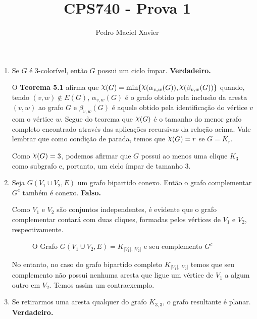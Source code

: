 \documentclass{homework}
\title{CPS740 - Prova 1}
\author{Pedro Maciel Xavier}
\begin{document}
	
	\maketitle
	
	\quest
	
	\begin{enumerate}[label=\textbf{\arabic*)}]
		\item Se $G$ é 3-colorível, então $G$ possui um ciclo ímpar. \textbf{Verdadeiro.} \par
		
		O \textbf{Teorema 5.1}\cite{jayme:18} afirma que $\rchi(G) = \min\{\rchi(\alpha_{v, w}(G)), \rchi(\beta_{v, w}(G))\}$ quando, tendo $(v, w) \notin E(G)$, $\alpha_{v, w}(G)$ é o grafo obtido pela inclusão da aresta $(v, w)$ ao grafo $G$ e $\beta_{v, w}(G)$ é aquele obtido pela identificação do vértice $v$ com o vértice $w$. Segue do teorema que $\rchi(G)$ é o tamanho do menor grafo completo encontrado através das aplicações recursivas da relação acima. Vale lembrar que como condição de parada, temos que $ \rchi(G) = r$ se $G = K_r$. \par
		
		Como $\rchi(G) = 3$, podemos afirmar que $G$ possui ao menos uma clique $K_3$ como subgrafo e, portanto, um ciclo ímpar de tamanho 3. \par
		
		\item Seja $G(V_1 \cup V_2, E)$ um grafo bipartido conexo. Então o grafo complementar $G^{c}$ também é conexo. \textbf{Falso.} \par
		
		Como $V_1$ e $V_2$ são conjuntos independentes, é evidente que o grafo complementar contará com duas cliques, formadas pelos vértices de $V_1$ e $V_2$, respectivamente. \par
		
		\begin{figure}[H]
			\centering
			
			\caption{O Grafo $G(V_1 \cup V_2, E) = K_{|V_1|, |V_2|}$ e seu complemento $G^{c}$}
			\label{fig:1.2.1}
		\end{figure}
		
		No entanto, no caso do grafo bipartido completo $K_{|V_1|, |V_2|}$ temos que seu complemento não possui nenhuma aresta que ligue um vértice de $V_1$ a algum outro em $V_2$. Temos assim um contraexemplo. \par
		
	\item Se retirarmos uma aresta qualquer do grafo $K_{3,3}$, o grafo resultante é planar. \textbf{Verdadeiro.} \par
	

\end{enumerate}
\end{document}
